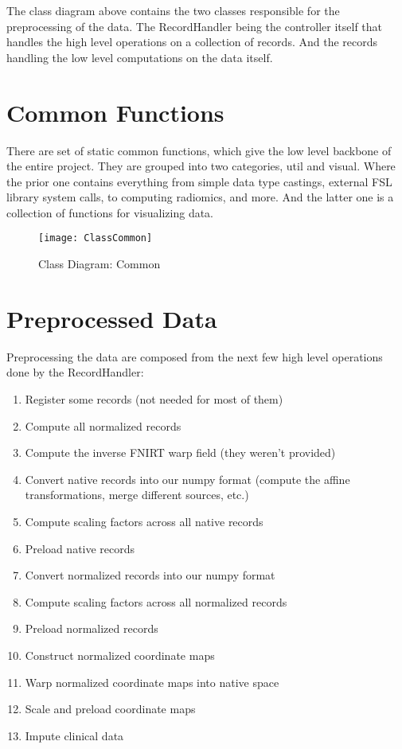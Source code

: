 The class diagram above contains the two classes responsible for the preprocessing of the data. The RecordHandler being the controller itself that handles the high level operations on a collection of records. And the records handling the low level computations on the data itself.

\section{Common Functions}

There are set of static common functions, which give the low level backbone of the entire project. They are grouped into two categories, util and visual. Where the prior one contains everything from simple data type castings, external \ac{FSL} library system calls, to computing radiomics, and more. And the latter one is a collection of functions for visualizing data.

\begin{figure}[H]
\centering
\texttt{[image: ClassCommon]}
\caption{Class Diagram: Common}
\end{figure}

\section{Preprocessed Data}

Preprocessing the data are composed from the next few high level operations done by the RecordHandler:
\begin{enumerate}
  \item Register some records (not needed for most of them)
  \item Compute all normalized records
  \item Compute the inverse \ac{FNIRT} warp field (they weren't provided)
  \item Convert native records into our numpy format (compute the affine transformations, merge different sources, etc.)
  \item Compute scaling factors across all native records
  \item Preload native records
  \item Convert normalized records into our numpy format
  \item Compute scaling factors across all normalized records
  \item Preload normalized records
  \item Construct normalized coordinate maps
  \item Warp normalized coordinate maps into native space
  \item Scale and preload coordinate maps
  \item Impute clinical data
\end{enumerate}

